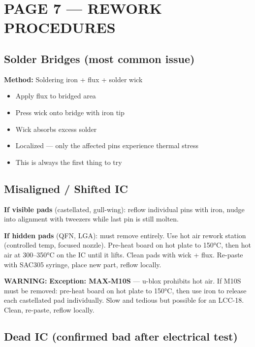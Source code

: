 \documentclass[11pt,a4paper]{article}
\newcommand{\dangerbox}[1]{\par\noindent\colorbox{danger!10}{\parbox{\dimexpr\textwidth-2\fboxsep}{%
\textcolor{danger}{\textbf{WARNING:}} #1}}\par\vspace{0.5em}}
\begin{document}
\newpage
\section*{PAGE 7 — REWORK PROCEDURES}

\subsection*{Solder Bridges (most common issue)}

\textbf{Method:} Soldering iron + flux + solder wick
\begin{itemize}[nosep]
\item Apply flux to bridged area
\item Press wick onto bridge with iron tip
\item Wick absorbs excess solder
\item Localized — only the affected pins experience thermal stress
\item This is always the first thing to try
\end{itemize}

\subsection*{Misaligned / Shifted IC}

\textbf{If visible pads} (castellated, gull-wing): reflow individual pins with iron, nudge into alignment with tweezers while last pin is still molten.

\textbf{If hidden pads} (QFN, LGA): must remove entirely. Use hot air rework station (controlled temp, focused nozzle). Pre-heat board on hot plate to 150°C, then hot air at 300--350°C on the IC until it lifts. Clean pads with wick + flux. Re-paste with SAC305 syringe, place new part, reflow locally.

\dangerbox{\textbf{Exception: MAX-M10S} — u-blox prohibits hot air. If M10S must be removed: pre-heat board on hot plate to 150°C, then use iron to release each castellated pad individually. Slow and tedious but possible for an LCC-18. Clean, re-paste, reflow locally.}

\subsection*{Dead IC (confirmed bad after electrical test)}
\end{document}
